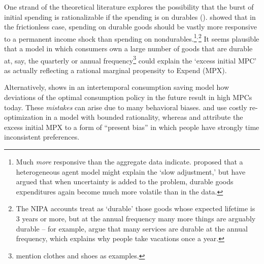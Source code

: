 \documentclass[\econtexRoot/HAFiscal]{subfiles}
\begin{document}
One strand of the theoretical literature explores the possibility that the burst of initial spending is rationalizable if the spending is on durables  (\cite{bcShocksStocks}).  \cite{mankiw:durgoods} showed that in the frictionless case, spending on durable goods should be vastly more responsive to a permanent income shock than spending on nondurables.\footnote{Much \textit{more} responsive than the aggregate data indicate.  \cite{caballeroDurable} proposed that a heterogeneous agent model might explain the `slow adjustment,' but \cite{cdSs} have argued that when uncertainty is added to the problem, durable goods expenditures again become much more volatile than in the data.}$^{,}$\footnote{The NIPA accounts treat as `durable' those goods whose expected lifetime is 3 years or more, but at the annual frequency many more things are arguably durable -- for example, \cite{hkpMemorable} argue that many services are durable at the annual frequency, which explains why people take vacations once a year.}  It seems plausible that a model in which consumers own a large number of goods that are durable at, say, the quarterly or annual frequency\footnote{\cite{bdTimeSeriesC} mention clothes and shoes as examples.} could explain the `excess initial MPC' as actually reflecting a rational marginal propensity to Expend (MPX).  




\hypertarget{indarte2024explains}{}

Alternatively, \cite{Lian2023-ca} shows in an intertemporal consumption saving model how deviations of the optimal consumption policy in the future result in high MPCs today. These \textit{mistakes} can arise due to many behavioral biases. \cite{Boutros_undated-ky} and \cite{Ilut2022-gg} use costly re-optimization in a model with bounded rationality, whereas \cite{indarte2024explains} and \cite{lmmPresentBias} attribute the excess initial MPX to a form of ``present bias'' in which people have strongly time inconsistent preferences.
\end{document}
